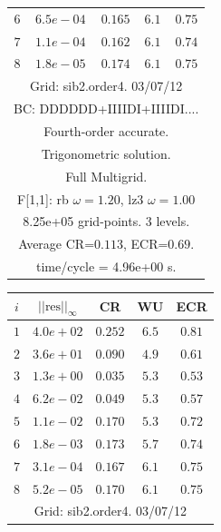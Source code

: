 \begin{table}[hbt]
\begin{center}
{\begin{tabular}{|c|c|c|c|c|}
 $ 6$  & $ 6.5e-04$ & $0.165$ & $ 6.1$ & $0.75$ \\ 
 $ 7$  & $ 1.1e-04$ & $0.162$ & $ 6.1$ & $0.74$ \\ 
 $ 8$  & $ 1.8e-05$ & $0.174$ & $ 6.1$ & $0.75$ \\ 
\hline 
\multicolumn{5}{|c|}{Grid: sib2.order4. 03/07/12}  \\
\multicolumn{5}{|c|}{BC: DDDDDD+IIIIDI+IIIIDI....}  \\
\multicolumn{5}{|c|}{Fourth-order accurate.}  \\
\multicolumn{5}{|c|}{Trigonometric solution.}  \\
\multicolumn{5}{|c|}{Full Multigrid.}  \\
\multicolumn{5}{|c|}{F[1,1]: rb $\omega=1.20$, lz3 $\omega=1.00$}  \\
\multicolumn{5}{|c|}{8.25e+05 grid-points. 3 levels.}  \\
\multicolumn{5}{|c|}{Average CR=$0.113$, ECR=$0.69$.}  \\
\multicolumn{5}{|c|}{time/cycle = 4.96e+00 s.}  \\
\hline 
\end{tabular}
\begin{tabular}{|c|c|c|c|c|} \hline 
 $i$   & $\vert\vert\mbox{res}\vert\vert_\infty$  &  CR     &  WU    & ECR  \\   \hline 
 $ 1$  & $ 4.0e+02$ & $0.252$ & $ 6.5$ & $0.81$ \\ 
 $ 2$  & $ 3.6e+01$ & $0.090$ & $ 4.9$ & $0.61$ \\ 
 $ 3$  & $ 1.3e+00$ & $0.035$ & $ 5.3$ & $0.53$ \\ 
 $ 4$  & $ 6.2e-02$ & $0.049$ & $ 5.3$ & $0.57$ \\ 
 $ 5$  & $ 1.1e-02$ & $0.170$ & $ 5.3$ & $0.72$ \\ 
 $ 6$  & $ 1.8e-03$ & $0.173$ & $ 5.7$ & $0.74$ \\ 
 $ 7$  & $ 3.1e-04$ & $0.167$ & $ 6.1$ & $0.75$ \\ 
 $ 8$  & $ 5.2e-05$ & $0.170$ & $ 6.1$ & $0.75$ \\ 
\hline 
\multicolumn{5}{|c|}{Grid: sib2.order4. 03/07/12}  \\

\end{tabular}}
\end{center}
\end{table}
